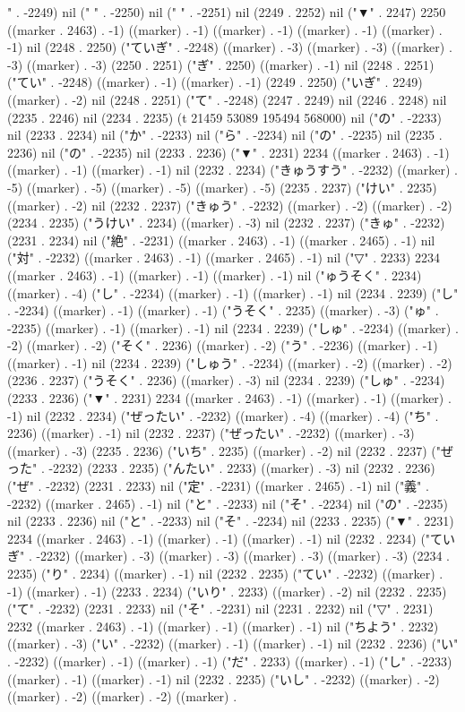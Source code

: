 " . -2249) nil (" " . -2250) nil (" " . -2251) nil (2249 . 2252) nil ("▼" . 2247) 2250 ((marker . 2463) . -1) ((marker) . -1) ((marker) . -1) ((marker) . -1) ((marker) . -1) nil (2248 . 2250) ("ていぎ" . -2248) ((marker) . -3) ((marker) . -3) ((marker) . -3) ((marker) . -3) (2250 . 2251) ("ぎ" . 2250) ((marker) . -1) nil (2248 . 2251) ("てい" . -2248) ((marker) . -1) ((marker) . -1) (2249 . 2250) ("いぎ" . 2249) ((marker) . -2) nil (2248 . 2251) ("て" . -2248) (2247 . 2249) nil (2246 . 2248) nil (2235 . 2246) nil (2234 . 2235) (t 21459 53089 195494 568000) nil ("の" . -2233) nil (2233 . 2234) nil ("か" . -2233) nil ("ら" . -2234) nil ("の" . -2235) nil (2235 . 2236) nil ("の" . -2235) nil (2233 . 2236) ("▼" . 2231) 2234 ((marker . 2463) . -1) ((marker) . -1) ((marker) . -1) nil (2232 . 2234) ("きゅうすう" . -2232) ((marker) . -5) ((marker) . -5) ((marker) . -5) ((marker) . -5) (2235 . 2237) ("けい" . 2235) ((marker) . -2) nil (2232 . 2237) ("きゅう" . -2232) ((marker) . -2) ((marker) . -2) (2234 . 2235) ("うけい" . 2234) ((marker) . -3) nil (2232 . 2237) ("きゅ" . -2232) (2231 . 2234) nil ("絶" . -2231) ((marker . 2463) . -1) ((marker . 2465) . -1) nil ("対" . -2232) ((marker . 2463) . -1) ((marker . 2465) . -1) nil ("▽" . 2233) 2234 ((marker . 2463) . -1) ((marker) . -1) ((marker) . -1) nil ("ゅうそく" . 2234) ((marker) . -4) ("し" . -2234) ((marker) . -1) ((marker) . -1) nil (2234 . 2239) ("し" . -2234) ((marker) . -1) ((marker) . -1) ("うそく" . 2235) ((marker) . -3) ("ゅ" . -2235) ((marker) . -1) ((marker) . -1) nil (2234 . 2239) ("しゅ" . -2234) ((marker) . -2) ((marker) . -2) ("そく" . 2236) ((marker) . -2) ("う" . -2236) ((marker) . -1) ((marker) . -1) nil (2234 . 2239) ("しゅう" . -2234) ((marker) . -2) ((marker) . -2) (2236 . 2237) ("うそく" . 2236) ((marker) . -3) nil (2234 . 2239) ("しゅ" . -2234) (2233 . 2236) ("▼" . 2231) 2234 ((marker . 2463) . -1) ((marker) . -1) ((marker) . -1) nil (2232 . 2234) ("ぜったい" . -2232) ((marker) . -4) ((marker) . -4) ("ち" . 2236) ((marker) . -1) nil (2232 . 2237) ("ぜったい" . -2232) ((marker) . -3) ((marker) . -3) (2235 . 2236) ("いち" . 2235) ((marker) . -2) nil (2232 . 2237) ("ぜった" . -2232) (2233 . 2235) ("んたい" . 2233) ((marker) . -3) nil (2232 . 2236) ("ぜ" . -2232) (2231 . 2233) nil ("定" . -2231) ((marker . 2465) . -1) nil ("義" . -2232) ((marker . 2465) . -1) nil ("と" . -2233) nil ("そ" . -2234) nil ("の" . -2235) nil (2233 . 2236) nil ("と" . -2233) nil ("そ" . -2234) nil (2233 . 2235) ("▼" . 2231) 2234 ((marker . 2463) . -1) ((marker) . -1) ((marker) . -1) nil (2232 . 2234) ("ていぎ" . -2232) ((marker) . -3) ((marker) . -3) ((marker) . -3) ((marker) . -3) (2234 . 2235) ("り" . 2234) ((marker) . -1) nil (2232 . 2235) ("てい" . -2232) ((marker) . -1) ((marker) . -1) (2233 . 2234) ("いり" . 2233) ((marker) . -2) nil (2232 . 2235) ("て" . -2232) (2231 . 2233) nil ("そ" . -2231) nil (2231 . 2232) nil ("▽" . 2231) 2232 ((marker . 2463) . -1) ((marker) . -1) ((marker) . -1) nil ("ちよう" . 2232) ((marker) . -3) ("い" . -2232) ((marker) . -1) ((marker) . -1) nil (2232 . 2236) ("い" . -2232) ((marker) . -1) ((marker) . -1) ("だ" . 2233) ((marker) . -1) ("し" . -2233) ((marker) . -1) ((marker) . -1) nil (2232 . 2235) ("いし" . -2232) ((marker) . -2) ((marker) . -2) ((marker) . -2) ((marker) . 